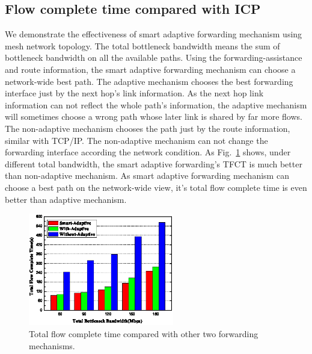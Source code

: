 \subsection{Flow complete time compared with ICP}

We demonstrate the effectiveness of smart adaptive forwarding mechanism using mesh network topology. The total bottleneck bandwidth means the sum of bottleneck bandwidth on all the available paths. Using the forwarding-assistance and route information, the smart adaptive forwarding mechanism can choose a network-wide best path. The adaptive mechanism chooses the best forwarding interface just by the next hop's link information. As the next hop link information can not reflect the whole path's information, the adaptive mechanism will sometimes choose a wrong path whose later link is shared by far more flows. The non-adaptive  mechanism chooses the path just by the route information, similar with TCP/IP. The non-adaptive mechanism can not change the forwarding interface according the network condition. As Fig.~\ref{fig-tfct} shows, under different total bandwidth, the smart adaptive forwarding's TFCT is much better than non-adaptive mechanism. As smart adaptive forwarding mechanism can choose a best path on the network-wide view, it's total flow complete time is even better than adaptive mechanism.

\begin{figure}[t]
	\centering
	\includegraphics[width=2.5in]{adaptive-pic-cut.eps}
	\caption{Total flow complete time compared with other two forwarding mechanisms.}
	\label{fig-tfct}
\end{figure}
